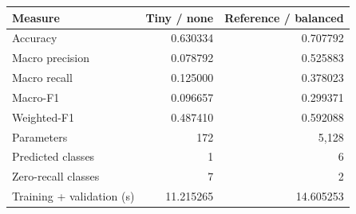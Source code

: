 \begin{tabular}{lrr}
\toprule
Measure & Tiny / none & Reference / balanced \\
\midrule
Accuracy & 0.630334 & 0.707792 \\
Macro precision & 0.078792 & 0.525883 \\
Macro recall & 0.125000 & 0.378023 \\
Macro-F1 & 0.096657 & 0.299371 \\
Weighted-F1 & 0.487410 & 0.592088 \\
Parameters & 172 & 5,128 \\
Predicted classes & 1 & 6 \\
Zero-recall classes & 7 & 2 \\
Training + validation (s) & 11.215265 & 14.605253 \\
\bottomrule
\end{tabular}
